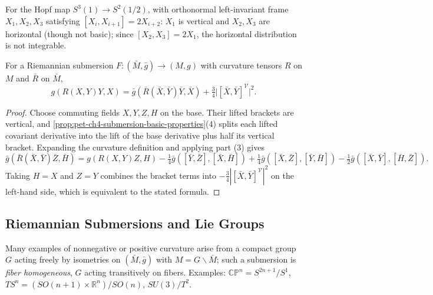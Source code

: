 \begin{example}
  \label{ex:pet-ch4-hopf-integrability}

  For the Hopf map $S^3(1)\to S^2(1/2)$, with orthonormal left-invariant frame
  $X_1,X_2,X_3$ satisfying $[X_i,X_{i+1}]=2X_{i+2}$: $X_1$ is vertical and
  $X_2,X_3$ are horizontal (though not basic); since $[X_2,X_3]=2X_1$, the
  horizontal distribution is not integrable.
\end{example}

\begin{theorem}
  \label{thm:pet-ch4-oneill-formula}

  For a Riemannian submersion $F:(\bar M,\bar g)\to(M,g)$ with curvature
  tensors $R$ on $M$ and $\bar R$ on $\bar M$,
  \[
    g(R(X,Y)Y,X)=\bar g(\bar R(\bar X,\bar Y)\bar Y,\bar X)+\tfrac34\big|[\bar X,\bar Y]^{\mathcal V}\big|^2.
  \]
\end{theorem}
\begin{proof}
  \sketch
  Choose commuting fields $X,Y,Z,H$ on the base. Their lifted brackets are
  vertical, and \cref{prop:pet-ch4-submersion-basic-properties}(4) splits each
  lifted covariant derivative into the lift of the base derivative plus half
  its vertical bracket. Expanding the curvature definition and applying part
  (3) gives
  \[
    \bar g(\bar R(\bar X,\bar Y)\bar Z,\bar H)=g(R(X,Y)Z,H)
    -\tfrac14\bar g([\bar Y,\bar Z],[\bar X,\bar H])
    +\tfrac14\bar g([\bar X,\bar Z],[\bar Y,\bar H])
    -\tfrac12\bar g([\bar X,\bar Y],[\bar H,\bar Z]).
  \]
  Taking $H=X$ and $Z=Y$ combines the bracket terms into
  $-\tfrac34|[\bar X,\bar Y]^{\mathcal V}|^2$ on the left-hand side, which is
  equivalent to the stated formula.
\end{proof}


\subsection{Riemannian Submersions and Lie Groups}

\begin{remark}
  \label{rem:pet-ch4-fiber-homogeneous-submersions}

  Many examples of nonnegative or positive curvature arise from a compact
  group $G$ acting freely by isometries on $(\bar M,\bar g)$ with
  $M=G\backslash\bar M$; such a submersion is \emph{fiber homogeneous}, $G$
  acting transitively on fibers. Examples: $\mathbb{CP}^n=S^{2n+1}/S^1$,
  $TS^n=(SO(n+1)\times\mathbb{R}^n)/SO(n)$, $SU(3)/T^2$.
\end{remark}

